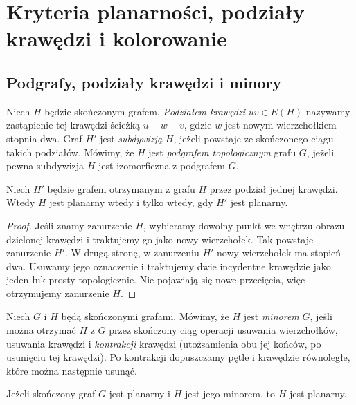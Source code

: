 \chapter{Kryteria planarności, podziały krawędzi i kolorowanie}
\label{ch:tg-kuratowski}

\section{Podgrafy, podziały krawędzi i minory}
\label{sec:tg-rozne-redukcje}

\begin{definicja}
Niech $H$ będzie skończonym grafem. \emph{Podziałem krawędzi}
$uv\in E(H)$ nazywamy zastąpienie tej krawędzi ścieżką
$u-w-v$, gdzie $w$ jest nowym wierzchołkiem stopnia dwa.
Graf $H'$ jest \emph{subdywizją} $H$, jeżeli powstaje ze skończonego
ciągu takich podziałów. Mówimy, że $H$ jest \emph{podgrafem
topologicznym} grafu $G$, jeżeli pewna subdywizja $H$
jest izomorficzna z podgrafem $G$.
\end{definicja}

\begin{stwierdzenie}
Niech $H'$ będzie grafem otrzymanym z grafu $H$ przez podział
jednej krawędzi. Wtedy $H$ jest planarny wtedy i tylko wtedy,
gdy $H'$ jest planarny.
\end{stwierdzenie}

\begin{proof}
Jeśli znamy zanurzenie $H$, wybieramy dowolny punkt we wnętrzu
obrazu dzielonej krawędzi i traktujemy go jako nowy wierzchołek.
Tak powstaje zanurzenie $H'$.
W drugą stronę, w zanurzeniu $H'$ nowy wierzchołek ma stopień
dwa. Usuwamy jego oznaczenie i traktujemy dwie incydentne
krawędzie jako jeden łuk prosty topologicznie.
Nie pojawiają się nowe przecięcia, więc otrzymujemy zanurzenie $H$.
\end{proof}

\begin{definicja}
Niech $G$ i $H$ będą skończonymi grafami. Mówimy, że
$H$ jest \emph{minorem} $G$, jeśli można otrzymać $H$
z $G$ przez skończony ciąg operacji usuwania wierzchołków,
usuwania krawędzi i \emph{kontrakcji} krawędzi (utożsamienia
obu jej końców, po usunięciu tej krawędzi).
Po kontrakcji dopuszczamy pętle i krawędzie równoległe,
które można następnie usunąć.
\end{definicja}

\begin{stwierdzenie}
Jeżeli skończony graf $G$ jest planarny i $H$ jest jego minorem,
to $H$ jest planarny.
\end{stwierdzenie}


